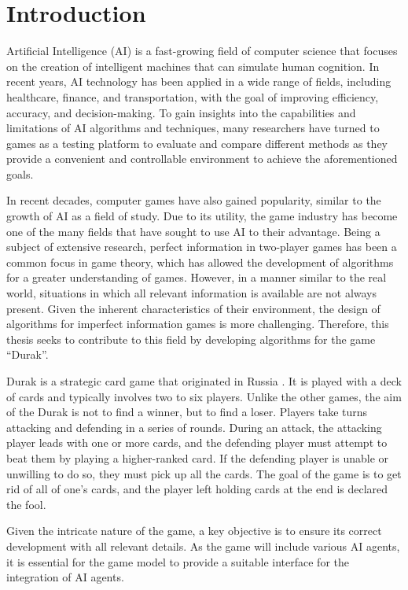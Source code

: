\chapter*{Introduction}

Artificial Intelligence (AI) is a fast-growing field of computer science that focuses on the creation of intelligent machines that can simulate human cognition. In recent years, AI technology has been applied in a wide range of fields, including healthcare, finance, and transportation, with the goal of improving efficiency, accuracy, and decision-making. To gain insights into the capabilities and limitations of AI algorithms and techniques, many researchers have turned to games as a testing platform to evaluate and compare different methods as they provide a convenient and controllable environment to achieve the aforementioned goals. 

In recent decades, computer games have also gained popularity, similar to the growth of AI as a field of study. Due to its utility, the game industry has become one of the many fields that have sought to use AI to their advantage. Being a subject of extensive research, perfect information in two-player games has been a common focus in game theory, which has allowed the development of algorithms for a greater understanding of games. However, in a manner similar to the real world, situations in which all relevant information is available are not always present. Given the inherent 
characteristics of their environment, the design of algorithms for imperfect information games is more challenging. Therefore, this thesis seeks to contribute to this field by developing algorithms for the game ``Durak''.

Durak is a strategic card game that originated in Russia \citep*{website:PAGAT_DURAK}. It is played with a deck of cards and typically involves two to six players. Unlike the other games, the aim of the Durak is not to find a winner, but to find a loser. Players take turns attacking and defending in a series of rounds. During an attack, the attacking player leads with one or more cards, and the defending player must attempt to beat them by playing a higher-ranked card. If the defending player is unable or unwilling to do so, they must pick up all the cards. The goal of the game is to get rid of all of one's cards, and the player left holding cards at the end is declared the fool. 

Given the intricate nature of the game, a key objective is to ensure its correct development with all relevant details. As the game will include various AI agents, it is essential for the game model to provide a suitable interface for the integration of AI agents. 

